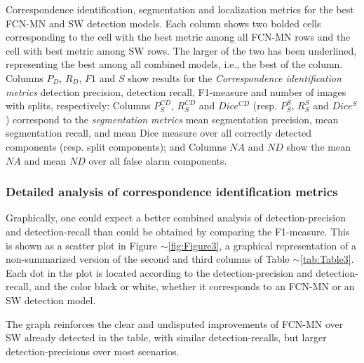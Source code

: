 \documentclass[a4paper,authoryear,review]{elsarticle}
\begin{document}
\begin{table}[]
{			Correspondence identification, segmentation and localization metrics for the best FCN-MN and SW detection models.   Each column shows two bolded cells corresponding to the cell with the best metric among all FCN-MN rows and the cell with best metric among SW rows. The larger of the two has been underlined, representing the best among all combined models, i.e., the best of the column.  Columns $P_D$, $R_D$, $F1$ and $S$ show results for the \emph{Correspondence identification metrics} detection precision, detection recall, F1-measure and number of images with splits, respectively: Columns $P_S^{CD}$, $R_S^{CD}$ and $Dice^{CD}$ (resp. $P_S^S$, $R_S^S$ and $Dice^S$) correspond to the \emph{segmentation metrics} mean segmentation precision, mean segmentation recall, and mean Dice measure over all correctly detected components (resp. split components); and Columns $NA$ and $ND$ show the mean $NA$ and mean $ND$ over all false alarm components.
		}
		\label{tab:Table3}
	\end{table}
	
	
	\subsubsection{Detailed analysis of correspondence identification metrics}
	\label{sub:compFCNSW}
	
	Graphically, one could expect a better combined analysis of detection-precision and detection-recall than could be obtained by comparing the F1-measure. This is shown as a scatter plot in Figure $\sim$\ref{fig:Figure3}, a graphical representation of a non-summarized version of the second and third columns of Table $\sim$\ref{tab:Table3}. Each dot  in the plot is located according to the detection-precision and detection-recall, and the color black or white, whether it corresponds to an FCN-MN or an SW detection model.
	
	The graph reinforces the clear and undisputed improvements of FCN-MN over SW already detected in the table, with similar detection-recalls, but larger detection-precisions over most scenarios. 
	
\end{document}
